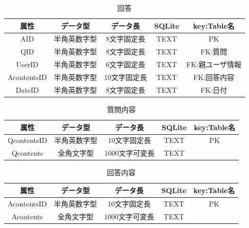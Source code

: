 \documentclass[a4j]{jarticle}
\begin{document}
\begin{table}[H]
    \caption{回答}
    \label{tbl: answer}
    \begin{center}
        \begin{tabular}{|c|c|c|c|c|} \hline
            属性 & データ型 & データ長 & SQLite & key:Table名\\ \hline \hline
            AID & 半角英数字型 & 8文字固定長 & TEXT & PK\\ \hline
            QID & 半角英数字型 & 8文字固定長 & TEXT & FK:質問\\ \hline
            UserID & 半角英数字型 & 6文字固定長 & TEXT & FK:親ユーザ情報\\ \hline
            AcontentsID & 半角英数字型 & 10文字固定長 & TEXT & FK:回答内容\\ \hline
            DateID & 半角英数字型 & 8文字固定長 & TEXT & FK:日付\\ \hline
        \end{tabular}
    \end{center}
\end{table}

\begin{table}[H]
    \caption{質問内容}
    \label{tbl: qcontents}
    \begin{center}
        \begin{tabular}{|c|c|c|c|c|} \hline
           属性 & データ型 & データ長 & SQLite & key:Table名\\ \hline \hline
            QcontentsID & 半角英数字型 & 10文字固定長 & TEXT & PK\\ \hline
            Qcontents & 全角文字型 & 1000文字可変長 & TEXT & \\ \hline
        \end{tabular}
    \end{center}
\end{table}


\begin{table}[H]
    \caption{回答内容}
    \label{tbl: acontents}
    \begin{center}
        \begin{tabular}{|c|c|c|c|c|} \hline
            属性 & データ型 & データ長 & SQLite & key:Table名\\ \hline \hline
            AcontentsID & 半角英数字型 & 10文字固定長 & TEXT & PK\\ \hline
            Acontents & 全角文字型 & 1000文字可変長 & TEXT & \\ \hline
        \end{tabular}
    \end{center}
\end{table}
\end{document}
